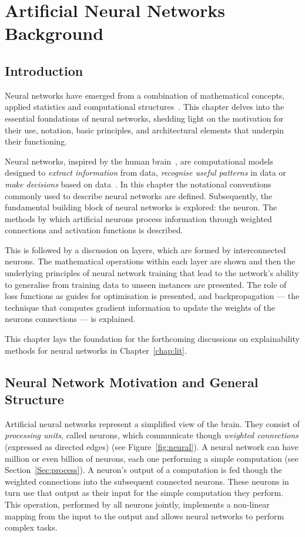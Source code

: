 \chapter{Artificial Neural Networks Background}
\label{chap:background}
\section{Introduction}

Neural networks have emerged from a combination of mathematical concepts, applied statistics and computational structures~\cite{du2013neural}. This chapter delves into the essential foundations of neural networks, shedding light on the motivation for their use, notation, basic principles, and architectural elements that underpin their functioning.

Neural networks, inspired by the human brain~\cite{arbib2003handbook, abraham2005artificial}, are computational models designed to \textit{extract information} from data, \textit{recognise useful patterns} in data or \textit{make decisions} based on data~\cite{basu2010use, perlovsky2001neural}. In this chapter the notational conventions commonly used to describe neural networks are defined. Subsequently, the fundamental building block of neural networks is explored: the neuron. The methods by which artificial neurons process information through weighted connections and activation functions is described.

This is followed by a discussion on layers, which are formed by interconnected neurons. The mathematical operations within each layer are shown and then the underlying principles of neural network training that lead to the network's ability to generalise from training data to unseen instances are presented. The role of loss functions as guides for optimisation is presented, and backpropagation --- the technique that computes gradient information to update the weights of the neurons connections --- is explained.

This chapter lays the foundation for the forthcoming discussions on explainability methods for neural networks in Chapter~\ref{chap:lit}.

\section{Neural Network Motivation and General Structure}

Artificial neural networks represent a simplified view of the brain. They consist of \textit{processing units}, called neurons, which communicate though \textit{weighted connections} (expressed as directed edges) (see Figure~\ref{fig:neural}). A neural network can have million or even billion of neurons, each one performing a simple computation (see Section~\ref{Sec:process}). A neuron's output of a computation is fed though the weighted connections into the subsequent connected neurons. These neurons in turn use that output as their input for the simple computation they perform. This operation, performed by all neurons jointly, implements a non-linear mapping from the input to the output and allows neural networks to perform complex tasks. 

